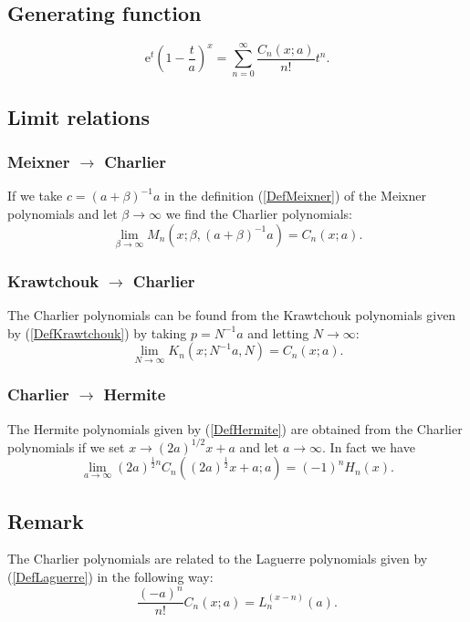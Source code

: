 \documentclass[envcountchap,graybox]{svmono}
\newcounter{rom}
\newcommand{\e}{\textrm{e}}
\begin{document}
\subsection*{Generating function}
\begin{equation}
\label{GenCharlier}
\e^t\left(1-\frac{t}{a}\right)^x=\sum_{n=0}^{\infty}\frac{C_n(x;a)}{n!}t^n.
\end{equation}

\subsection*{Limit relations}

\subsubsection*{Meixner $\rightarrow$ Charlier}
If we take $c=(a+\beta)^{-1}a$ in the definition (\ref{DefMeixner}) of the Meixner polynomials
and let $\beta\rightarrow\infty$ we find the Charlier polynomials:
$$\lim_{\beta\rightarrow\infty}M_n(x;\beta,(a+\beta)^{-1}a)=C_n(x;a).$$

\subsubsection*{Krawtchouk $\rightarrow$ Charlier}
The Charlier polynomials can be found from the Krawtchouk polynomials given by
(\ref{DefKrawtchouk}) by taking $p=N^{-1}a$ and letting $N\rightarrow\infty$:
$$\lim_{N\rightarrow\infty}K_n(x;N^{-1}a,N)=C_n(x;a).$$

\subsubsection*{Charlier $\rightarrow$ Hermite}
The Hermite polynomials given by (\ref{DefHermite}) are obtained from the Charlier polynomials
if we set $x\rightarrow (2a)^{1/2}x+a$ and let $a\rightarrow\infty$. In fact we have
\begin{equation}
\lim_{a\rightarrow\infty}
(2a)^{\frac{1}{2}n}C_n((2a)^{\frac{1}{2}}x+a;a)=(-1)^nH_n(x).
\end{equation}

\subsection*{Remark}
The Charlier polynomials are related to the Laguerre polynomials given by (\ref{DefLaguerre})
in the following way:
$$\frac{(-a)^n}{n!}C_n(x;a)=L_n^{(x-n)}(a).$$
\end{document}
